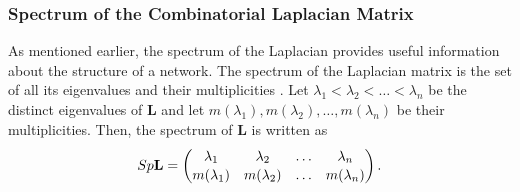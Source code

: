 \documentclass[10pt,a4paper]{article}
\theoremstyle{plain}
\theoremstyle{definition}
\begin{document}
\subsubsection{Spectrum of the Combinatorial Laplacian Matrix}
As mentioned earlier, the spectrum of the Laplacian provides useful information about the structure of a network. The spectrum of the Laplacian matrix is the set of all its eigenvalues and their multiplicities \citep{estrada2011structure}. Let $\lambda_1 < \lambda_2 < \ldots < \lambda_n$ be the distinct eigenvalues of $\mathbf{L}$ and let $m(\lambda_1),m(\lambda_2), \ldots,m(\lambda_n)$ be their multiplicities. Then, the spectrum of $\mathbf{L}$ is written as
\begin{eqnarray}
Sp\mathbf{L} = 
\renewcommand*{\arraystretch}{1.1}
\begin{pmatrix*}
\lambda_1 & \lambda_2 & \ldots & \lambda_n \\
m(\lambda_1) & m(\lambda_2) & \ldots & m(\lambda_n)
\end{pmatrix*}.
\end{eqnarray}
\end{document}
